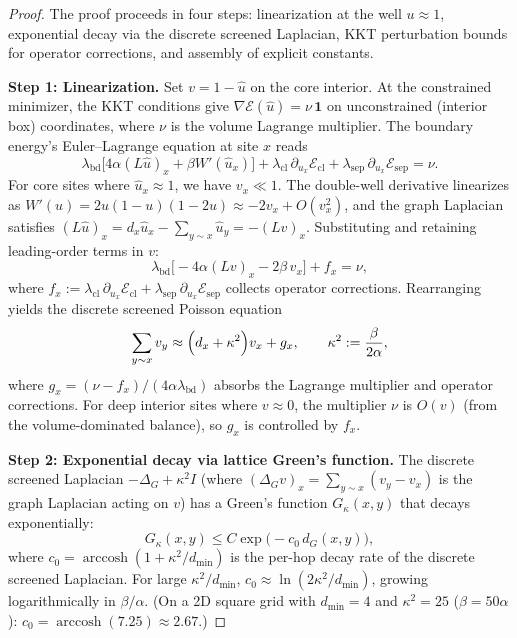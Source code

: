 \documentclass[lettersize,journal]{IEEEtran}
\begin{document}
\begin{proof}
The proof proceeds in four steps: linearization at the well $u \approx 1$, exponential decay via the discrete screened Laplacian, KKT perturbation bounds for operator corrections, and assembly of explicit constants.

\medskip\noindent\textbf{Step 1: Linearization.}
Set $v = 1 - \hat{u}$ on the core interior. At the constrained minimizer, the KKT conditions give $\nabla\mathcal{E}(\hat{u}) = \nu\,\mathbf{1}$ on unconstrained (interior box) coordinates, where $\nu$ is the volume Lagrange multiplier. The boundary energy's Euler--Lagrange equation at site $x$ reads
\[
\lambda_{\mathrm{bd}}\bigl[4\alpha(L\hat{u})_x + \beta W'(\hat{u}_x)\bigr] + \lambda_{\mathrm{cl}}\,\partial_{u_x}\mathcal{E}_{\mathrm{cl}} + \lambda_{\mathrm{sep}}\,\partial_{u_x}\mathcal{E}_{\mathrm{sep}} = \nu.
\]
For core sites where $\hat{u}_x \approx 1$, we have $v_x \ll 1$. The double-well derivative linearizes as $W'(u) = 2u(1-u)(1-2u) \approx -2v_x + O(v_x^2)$, and the graph Laplacian satisfies $(L\hat{u})_x = d_x\hat{u}_x - \sum_{y \sim x}\hat{u}_y = -(Lv)_x$. Substituting and retaining leading-order terms in $v$:
\[
\lambda_{\mathrm{bd}}\bigl[-4\alpha(Lv)_x - 2\beta\,v_x\bigr] + f_x = \nu,
\]
where $f_x := \lambda_{\mathrm{cl}}\,\partial_{u_x}\mathcal{E}_{\mathrm{cl}} + \lambda_{\mathrm{sep}}\,\partial_{u_x}\mathcal{E}_{\mathrm{sep}}$ collects operator corrections. Rearranging yields the discrete screened Poisson equation
\begin{equation}
\label{eq:screened-poisson}
\sum_{y \sim x} v_y \approx \Bigl(d_x + \kappa^2\Bigr) v_x + g_x, \qquad \kappa^2 := \frac{\beta}{2\alpha},
\end{equation}
where $g_x = (\nu - f_x)/(4\alpha\lambda_{\mathrm{bd}})$ absorbs the Lagrange multiplier and operator corrections. For deep interior sites where $v \approx 0$, the multiplier $\nu$ is $O(v)$ (from the volume-dominated balance), so $g_x$ is controlled by $f_x$.

\medskip\noindent\textbf{Step 2: Exponential decay via lattice Green's function.}
The discrete screened Laplacian $-\Delta_G + \kappa^2 I$ (where $(\Delta_G v)_x = \sum_{y\sim x}(v_y - v_x)$ is the graph Laplacian acting on $v$) has a Green's function $G_\kappa(x,y)$ that decays exponentially:
\[
G_\kappa(x,y) \leq C\exp\!\bigl(-c_0\,d_G(x,y)\bigr),
\]
where $c_0 = \operatorname{arccosh}(1 + \kappa^2/d_{\min})$ is the per-hop decay rate of the discrete screened Laplacian. For large $\kappa^2/d_{\min}$, $c_0 \approx \ln(2\kappa^2/d_{\min})$, growing logarithmically in $\beta/\alpha$. (On a 2D square grid with $d_{\min} = 4$ and $\kappa^2 = 25$ ($\beta = 50\alpha$): $c_0 = \operatorname{arccosh}(7.25) \approx 2.67$.)


\end{proof}
\end{document}
